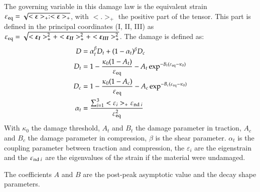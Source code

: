 The governing variable in this damage
law is the equivalent strain $\varepsilon_{{\mathrm{eq}}} =
\sqrt{<\boldsymbol{\varepsilon}>_+:<\boldsymbol{\varepsilon}>_+}$, with $<.>_+$ the positive
part of the tensor. This part is defined in the principal coordinates (I, II, III) as $\varepsilon_{{\mathrm{eq}}} =
\sqrt{<\boldsymbol{\varepsilon_I}>_+^2 + <\boldsymbol{\varepsilon_{II}}>_+^2 + <\boldsymbol{\varepsilon_{III}}>_+^2}$.
The damage is defined as:
\begin{align}
  D &= \alpha_t^\beta D_t + (1-\alpha_t)^\beta D_c\\
  D_t &= 1 - \frac{\kappa_0 (1- A_t)}{\varepsilon_{{\mathrm{eq}}}} - A_t \exp^{-B_t(\varepsilon_{{\mathrm{eq}}}-\kappa_0)}\\
  D_c &= 1 - \frac{\kappa_0 (1- A_c)}{\varepsilon_{{\mathrm{eq}}}} - A_c
  \exp^{-B_c(\varepsilon_{{\mathrm{eq}}}-\kappa_0)}\\
  \alpha_t &= \frac{\sum_{i=1}^3<\varepsilon_i>_+\varepsilon_{{\mathrm{nd}}\;i}}{\varepsilon_{{\mathrm{eq}}}^2}
\end{align}
With $\kappa_0$ the damage threshold, $A_t$ and $B_t$ the damage parameter in
traction, $A_c$ and $B_c$ the damage parameter in compression, $\beta$ is the
shear parameter. $\alpha_t$ is the coupling parameter between traction and
compression, the $\varepsilon_i$ are the eigenstrain and the
$\varepsilon_{{\mathrm{nd}}\;i}$ are the eigenvalues of the strain if the material
were undamaged.

The coefficients $A$ and $B$ are the post-peak asymptotic
value and the decay shape parameters.





